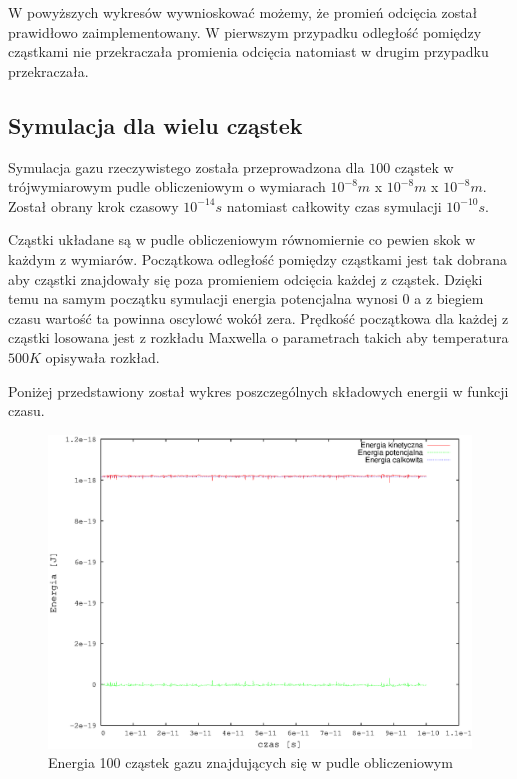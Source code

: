 \documentclass[a4paper,10pt]{article}
\begin{document}
W powyższych wykresów wywnioskować możemy, że promień odcięcia został prawidłowo zaimplementowany. W pierwszym przypadku odległość pomiędzy cząstkami nie przekraczała promienia odcięcia natomiast w drugim przypadku przekraczała.

\subsection{Symulacja dla wielu cząstek}

Symulacja gazu rzeczywistego została przeprowadzona dla $100$ cząstek w trójwymiarowym pudle obliczeniowym o wymiarach $10^{-8}m$ x $10^{-8}m$ x $10^{-8}m$. Został obrany krok czasowy $10^{-14}s$ natomiast całkowity czas symulacji $10^{-10}s$.

Cząstki układane są w pudle obliczeniowym równomiernie co pewien skok w każdym z wymiarów. Początkowa odległość pomiędzy cząstkami jest tak dobrana aby cząstki znajdowały się poza promieniem odcięcia każdej z cząstek. Dzięki temu na samym początku symulacji energia potencjalna wynosi 0 a z biegiem czasu wartość ta powinna oscylowć wokół zera. Prędkość początkowa dla każdej z cząstki losowana jest z rozkładu Maxwella o parametrach takich aby temperatura $500 K$ opisywała rozkład.

Poniżej przedstawiony został wykres poszczególnych składowych energii w funkcji czasu.

\begin{figure}[h]
\begin{center}
\includegraphics[scale=0.6]{wyniki/simulation.eps}
\caption{Energia 100 cząstek gazu znajdujących się w pudle obliczeniowym}
\label{pic:simulation}
\end{center}
\end{figure}
\FloatBarrier
\end{document}
